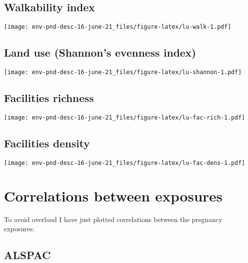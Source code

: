 \documentclass[]{article}
\begin{document}
\newpage

\hypertarget{walkability-index}{%
\subsection{Walkability index}\label{walkability-index}}

\texttt{[image: env-pnd-desc-16-june-21\_files/figure-latex/lu-walk-1.pdf]}

\newpage

\hypertarget{land-use-shannons-evenness-index}{%
\subsection{Land use (Shannon's evenness index)}\label{land-use-shannons-evenness-index}}

\texttt{[image: env-pnd-desc-16-june-21\_files/figure-latex/lu-shannon-1.pdf]}

\newpage

\hypertarget{facilities-richness}{%
\subsection{Facilities richness}\label{facilities-richness}}

\texttt{[image: env-pnd-desc-16-june-21\_files/figure-latex/lu-fac-rich-1.pdf]}

\newpage

\hypertarget{facilities-density}{%
\subsection{Facilities density}\label{facilities-density}}

\texttt{[image: env-pnd-desc-16-june-21\_files/figure-latex/lu-fac-dens-1.pdf]}

\newpage

\hypertarget{correlations-between-exposures}{%
\section{Correlations between exposures}\label{correlations-between-exposures}}

To avoid overload I have just plotted correlations between the pregnancy
exposures.

\hypertarget{alspac}{%
\subsection{ALSPAC}\label{alspac}}
\end{document}
